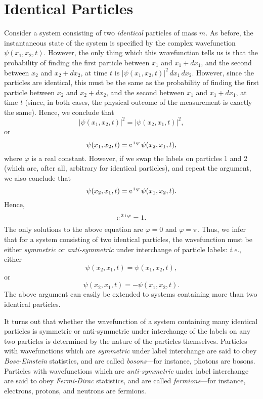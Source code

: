 \section{Identical Particles}\label{siden}
Consider a system consisting of two {\em identical}\/ particles of mass $m$.
As before, the instantaneous state of the system is specified by the
complex wavefunction $\psi(x_1,x_2,t)$. However, the only thing
which this wavefunction tells us is that the probability of finding the
first particle between $x_1$ and $x_1+dx_1$, and the second 
between $x_2$ and $x_2+dx_2$, at time $t$ is $|\psi(x_1,x_2,t)|^2\,dx_1\,dx_2$. However, since the particles are
identical, this must be the same as the probability of finding the 
first particle between $x_2$ and $x_2+dx_2$, and the second
between $x_1$ and $x_1+dx_1$, at time $t$ (since, in both
cases, the physical outcome of the measurement is exactly the same).
Hence, we conclude that
\begin{equation}
|\psi(x_1,x_2,t)|^2 = |\psi(x_2,x_1,t)|^2,
\end{equation}
or
\begin{equation}
\psi(x_1,x_2,t) = {\rm e}^{\,{\rm i}\,\varphi}\,\psi(x_2,x_1,t),
\end{equation}
where $\varphi$ is a real constant. However, if we swap the labels on
particles 1 and 2 (which are, after all, arbitrary for identical particles), and repeat the argument, we also conclude that
\begin{equation}
\psi(x_2,x_1,t) = {\rm e}^{\,{\rm i}\,\varphi}\,\psi(x_1,x_2,t).
\end{equation}
Hence,
\begin{equation}
{\rm e}^{\,2\,{\rm i}\,\varphi} = 1.
\end{equation}
The only solutions to the above equation are $\varphi=0$ and $\varphi=\pi$.
Thus, we infer that for a system consisting of two identical particles, the wavefunction
must be either {\em symmetric}\/ or {\em anti-symmetric}\/ under interchange
of particle labels: {\em i.e.}, either
\begin{equation}
\psi(x_2,x_1,t) = \psi(x_1,x_2,t),
\end{equation}
or
\begin{equation}
\psi(x_2,x_1,t) = -\psi(x_1,x_2,t).
\end{equation}
The above argument can easily be extended to systems containing more
than two identical particles.

It turns out that whether the wavefunction of a
system containing many identical particles is symmetric or anti-symmetric
under interchange of the labels on any two particles  is determined by the nature
of the particles themselves. Particles with wavefunctions which are {\em symmetric}\/ under
label interchange
are said to obey {\em Bose-Einstein}\/ statistics, and
are called {\em bosons}---for instance, photons are bosons. Particles with 
wavefunctions which are {\em anti-symmetric}\/ 
under label interchange are said to obey {\em Fermi-Dirac}\/
statistics, and are called {\em fermions}---for instance, electrons,
protons, and neutrons are fermions.

